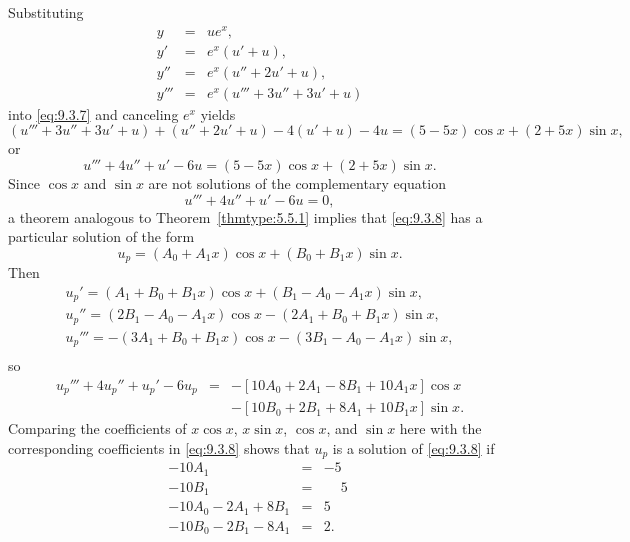 \begin{examplesolution}
\solution Substituting
\begin{eqnarray*}
  y    & = & ue^{x},           \\
  y'   & = & e^{x}(u'+u),      \\
  y''  & = & e^{x}(u''+2u'+u), \\
  y''' & = & e^{x}(u'''+3u''+3u'+u)
\end{eqnarray*}
into \eqref{eq:9.3.7} and canceling $e^{x}$ yields
\[
  (u'''+3u''+3u'+u)+(u''+2u'+u)-4(u'+u)-4u =(5-5x)\cos x+(2+5x)\sin x,
\]
or
\begin{equation}
  \label{eq:9.3.8}u'''+4u''+u'-6u=(5-5x)\cos x+(2+5x)\sin x.
\end{equation}
Since $\cos x$ and $\sin x$ are not solutions of the complementary equation
\[
  u'''+4u''+u'-6u=0,
\]
a theorem analogous to Theorem~\ref{thmtype:5.5.1} implies that \eqref{eq:9.3.8} has a particular
solution of the form
\begin{equation}
  \label{eq:9.3.9}u_{p}=(A_{0}+A_{1}x)\cos x+(B_{0}+B_{1}x)\sin x.
\end{equation}
Then
\begin{eqnarray*}
  u_{p}'=(A_{1}+B_{0}+B_{1}x)\cos x+(B_{1}-A_{0}-A_{1}x)\sin x,\\ u_{p}''=(2B_{1}-A_{0}-A_{1}x)\cos x-(2A_{1}+B_{0}+B_{1}x)\sin x,\\ u_{p}'''=-(3A_{1}+B_{0}+B_{1}x)\cos x-(3B_{1}-A_{0}-A_{1}x)\sin x,\\
\end{eqnarray*}
so
\[
  \begin{array}{rcl}
    u_{p}'''+4u_{p}''+u_{p}'-6u_{p} & = & -\left[10A_{0}+2A_{1}-8B_{1}+10A_{1}x\right]\cos x  \\
                                    &   & -\left[10B_{0}+2B_{1}+8A_{1}+10B_{1}x\right]\sin x.
  \end{array}
\]
Comparing the coefficients of $x\cos x$, $x\sin x$, $\cos x$, and $\sin x$ here with the
corresponding coefficients in \eqref{eq:9.3.8} shows that $u_{p}$ is a solution of \eqref{eq:9.3.8}
if
\[
  \begin{array}{rcr}
    -10A_{1}               & = & -5\phantom{.}           \\
    -10B_{1}               & = & \phantom{-}5\phantom{.} \\
    -10A_{0}-2A_{1}+8B_{1} & = & 5\phantom{.}            \\
    -10B_{0}-2B_{1}-8A_{1} & = & 2.
  \end{array}
\]
\end{examplesolution}
